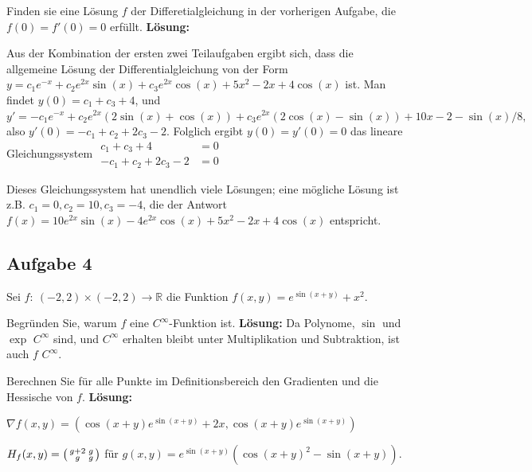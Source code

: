 \documentclass[a4paper,10pt]{article}
\def\R{\mathbb{R}}
\begin{document}
Finden sie eine Lösung \( f \) der Differetialgleichung in der vorherigen Aufgabe, die \( f(0) = f'(0) = 0 \) erfüllt.
\textbf{Lösung:}
\begin{enumerate*}
    \item Aus der Kombination der ersten zwei Teilaufgaben ergibt sich, dass die allgemeine Lösung der Differentialgleichung von der Form
    \(
        y = c_1 e^{-x} + c_2 e^{2x} \sin(x) + c_3 e^{2x} \cos(x) + 5x^2 - 2x + 4 \cos(x)
    \)
    ist. Man findet \( y(0) = c_1 + c_3 + 4 \), und
    \(
        y' = -c_1 e^{-x} + c_2 e^{2x} (2 \sin(x) + \cos(x)) + c_3 e^{2x} (2 \cos(x) - \sin(x)) + 10x - 2 - \sin(x) / 8 \text{,}
    \)
    also \( y'(0) = -c_1 + c_2 + 2c_3 - 2 \). Folglich ergibt \( y(0) = y'(0) = 0 \) das lineare Gleichungssystem
    \(
        \begin{aligned}
            c_1 + c_3 + 4 &= 0 \\
            -c_1 + c_2 + 2c_3 - 2 &= 0
        \end{aligned}
    \)
    \item Dieses Gleichungssystem hat unendlich viele Lösungen; eine mögliche Lösung ist z.B. \( c_1 = 0, c_2 = 10, c_3 = -4 \), die der Antwort
    \(
        f(x) = 10e^{2x} \sin(x) - 4e^{2x} \cos(x) + 5x^2 - 2x + 4 \cos(x)
    \)
    entspricht.
\end{enumerate*}


\subsection{Aufgabe 4}

Sei \( f: \: (-2, 2) \times (-2, 2) \to \R \) die Funktion
\(
    f(x, y) = e^{\sin(x + y)} + x^2 \text{.}
\)

Begründen Sie, warum \( f \) eine \( C^\infty \)-Funktion ist.
\textbf{Lösung:} Da Polynome, \( \sin \) und \( \exp \) \( C^\infty \) sind, und \( C^\infty \) erhalten bleibt unter Multiplikation und Subtraktion, ist auch \( f \) \( C^\infty \).

Berechnen Sie für alle Punkte im Definitionsbereich den Gradienten und die Hessische von \( f \).
\textbf{Lösung:}
\begin{enumerate*}
    \item \( \nabla f(x, y) = (\cos(x + y) e^{\sin(x + y)} + 2x, \cos(x + y) e^{\sin(x + y)}) \)
    \item \(
        H_f(x, y) = \begin{psmallmatrix} g + 2 & g \\ g & g \end{psmallmatrix}
    \)
    für \( g(x, y) = e^{\sin(x + y)} (\cos(x + y)^2 - \sin(x + y)) \).
\end{enumerate*}
\end{document}
